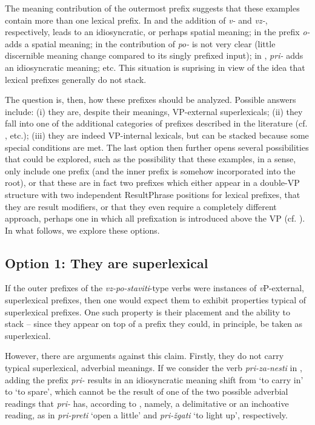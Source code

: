\documentclass[output=paper,colorlinks,citecolor=brown]{langscibook}
\begin{document}
\noindent The meaning contribution of the outermost prefix suggests that these examples contain more than one lexical prefix. In  and  the addition of \textit{v-} and \textit{vz-}, respectively, leads to an idiosyncratic, or perhaps spatial meaning; in  the prefix \textit{o-} adds a spatial meaning; in  the contribution of \textit{po-} is not very clear (little discernible meaning change compared to its singly prefixed input); in , \textit{pri-} adds an idiosyncratic meaning; etc. This situation is suprising in view of the idea that lexical prefixes generally do not stack.

The question is, then, how these prefixes should be analyzed. Possible answers include: (i) they are, despite their meanings, VP-external superlexicals; (ii) they fall into one of the additional categories of prefixes described in the literature (cf. \citealt{babko2003perfectivity,tatevosov2008intermediate,markova2011nature}, etc.); (iii) they are indeed VP-internal lexicals, but can be stacked because some special conditions are met. The last option then further opens several possibilities that could be explored, such as the possibility that these examples, in a sense, only include one prefix (and the inner prefix is somehow incorporated into the root), or that these are in fact two prefixes which either appear in a double-VP structure with two independent ResultPhrase positions for lexical prefixes, that they are result modifiers, or that they even require a completely different approach, perhaps one in which all prefixation is introduced above the VP (cf. \citealt{biskup2023}). In what follows, we explore these options.                 

\subsection{Option 1: They are superlexical}\label{sec:theyaresuperlexical}
If the outer prefixes of the \textit{vz-po-staviti}-type verbs were instances of \textit{v}P-external, superlexical prefixes, then one would expect them to exhibit properties typical of superlexical prefixes. One such property is their placement and the ability to stack -- since they appear on top of a prefix they could, in principle, be taken as superlexical. 

However, there are arguments against this claim. Firstly, they do not carry typical superlexical, adverbial meanings. If we consider the verb \textit{pri-za-nesti} in , adding the prefix \textit{pri-} results in an idiosyncratic meaning shift from `to carry in' to `to spare', which cannot be the result of one of the two possible adverbial readings that \textit{pri-} has, according to \citet{sekli2016pomeni}, namely, a delimitative or an inchoative reading, as in \textit{pri-preti} `open a little' and \textit{pri-žgati} `to light up', respectively.  
\end{document}
